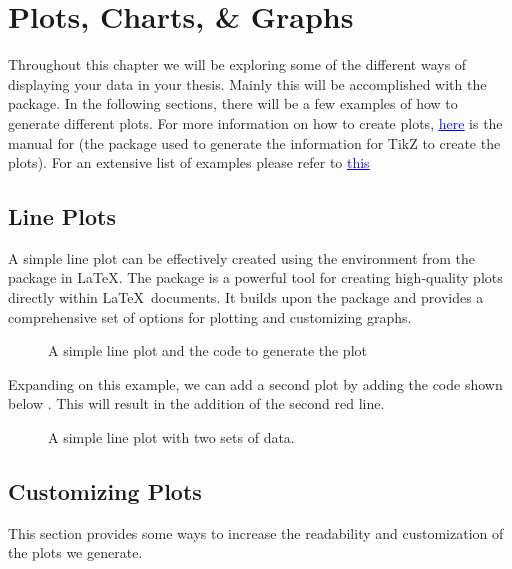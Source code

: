 \chapter{Plots, Charts, \& Graphs}\label{ch:plotsandgraphs}
		Throughout this chapter we will be exploring some of the different ways of displaying your data in your thesis.
		Mainly this will be accomplished with the  package.
		In the following sections, there will be a few examples of how to generate different plots.
		For more information on how to create plots, \href{https://mirror.its.dal.ca/ctan/graphics/pgf/contrib/pgfplots/doc/pgfplots.pdf}{\textcolor{blue}{\underline{here}}} is the manual for  (the package used to generate the information for TikZ to create the plots).
		For an extensive list of examples please refer to \href{https://pgfplots.sourceforge.net/gallery.html}{\textcolor{blue}{\underline{this}}}

	\section{Line Plots}
		A simple line plot can be effectively created using the  environment from the  package in \LaTeX. 
		The  package is a powerful tool for creating high-quality plots directly within \LaTeX\ documents. 
		It builds upon the  package and provides a comprehensive set of options for plotting and customizing graphs.
		\begin{figure}[p]
			\centering
			\caption[A simple line plot.]{A simple line plot and the code to generate the plot }\label{fig:line-plot}
		\end{figure}


		Expanding on this example, we can add a second plot by adding the code shown below .
		This will result in the addition of the second red line.
		\begin{figure}[p]
			\centering
			\caption{A simple line plot with two sets of data.}
			\label{fig:line-plot-2}
		\end{figure}


	\section{Customizing Plots}
		This section provides some ways to increase the readability and customization of the plots we generate.
